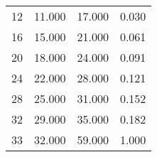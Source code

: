 % 
\begin{tabular}{cccc}
  \hline
  \hline
12 & 11.000 & 17.000 & 0.030 \\ 
  16 & 15.000 & 21.000 & 0.061 \\ 
  20 & 18.000 & 24.000 & 0.091 \\ 
  24 & 22.000 & 28.000 & 0.121 \\ 
  28 & 25.000 & 31.000 & 0.152 \\ 
  32 & 29.000 & 35.000 & 0.182 \\ 
  33 & 32.000 & 59.000 & 1.000 \\ 
   \hline
\end{tabular}
